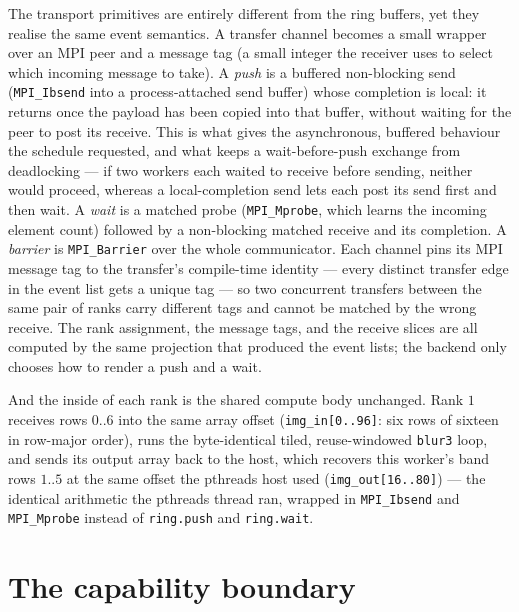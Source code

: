 The transport primitives are entirely different from the ring buffers, yet they
realise the same event semantics. A transfer channel becomes a small wrapper over an
MPI peer and a message tag (a small integer the receiver uses to select which
incoming message to take). A \emph{push} is a buffered non-blocking send
(\texttt{MPI\_Ibsend} into a process-attached send buffer) whose completion is local:
it returns once the payload has been copied into that buffer, without waiting for the
peer to post its receive. This is what gives the asynchronous, buffered behaviour the
schedule requested, and what keeps a wait-before-push exchange from deadlocking --- if
two workers each waited to receive before sending, neither would proceed, whereas a
local-completion send lets each post its send first and then wait. A \emph{wait} is a
matched probe (\texttt{MPI\_Mprobe}, which learns the incoming element count) followed
by a non-blocking matched receive and its completion. A \emph{barrier} is
\texttt{MPI\_Barrier} over the whole communicator. Each channel pins its MPI message
tag to the transfer's compile-time identity --- every distinct transfer edge in the
event list gets a unique tag --- so two concurrent transfers between the same pair of
ranks carry different tags and cannot be matched by the wrong receive. The rank assignment, the message tags, and the receive slices are all
computed by the same projection that produced the event lists; the backend only
chooses how to render a push and a wait.

And the inside of each rank is the shared compute body unchanged. Rank $1$ receives
rows $0..6$ into the same array offset (\texttt{img\_in[0..96]}: six rows of sixteen
in row-major order), runs the byte-identical tiled, reuse-windowed \texttt{blur3}
loop, and sends its output array back to the host, which recovers this worker's band
rows $1..5$ at the same offset the pthreads host used (\texttt{img\_out[16..80]}) ---
the identical arithmetic the pthreads thread ran, wrapped in \texttt{MPI\_Ibsend} and
\texttt{MPI\_Mprobe} instead of \texttt{ring.push} and \texttt{ring.wait}.

\section{The capability boundary}\label{sec:wt-capability}

